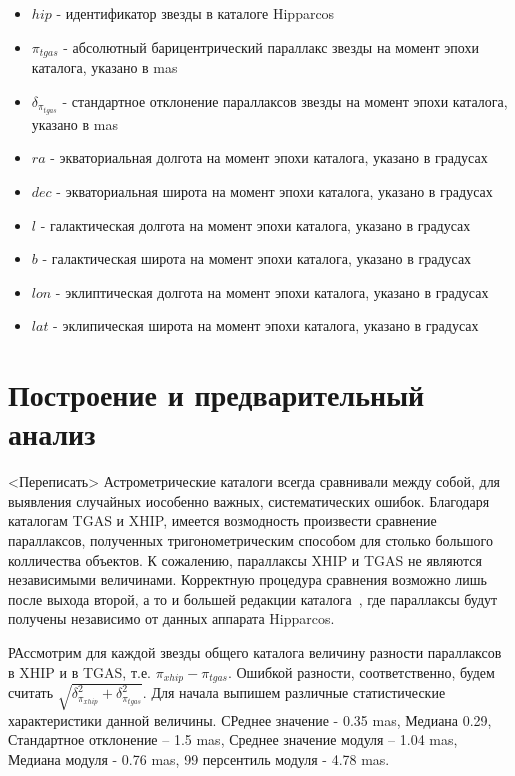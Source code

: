 \documentclass[14pt]{article} %
\begin{document}
\begin{itemize}

\item $hip$ - идентификатор звезды в каталоге Hipparcos

\item $\pi_{tgas}$ - абсолютный барицентрический параллакс звезды на момент эпохи каталога, указано в mas

\item $\delta_{\pi_{tgas}}$ - стандартное отклонение параллаксов звезды на момент эпохи каталога, указано в mas

\item $ra$ - экваториальная долгота на момент эпохи каталога, указано в градусах

\item $dec$ - экваториальная широта на момент эпохи каталога, указано в градусах

\item $l$ - галактическая долгота на момент эпохи каталога, указано в градусах

\item $b$ - галактическая широта на момент эпохи каталога, указано в градусах

\item $lon$ - эклиптическая долгота на момент эпохи каталога, указано в градусах

\item $lat$ - эклипическая широта на момент эпохи каталога, указано в градусах

\end{itemize}

\section{Построение и предварительный анализ}\label{errvid}
<Переписать>
Астрометрические каталоги всегда сравнивали между собой, для выявления случайных иособенно важных, систематических ошибок. Благодаря каталогам TGAS и XHIP, имеется возмодность произвести сравнение параллаксов, полученных тригонометрическим способом для столько большого колличества объектов. К сожалению, параллаксы XHIP и TGAS  не являются независимыми величинами. Корректную процедура сравнения возможно лишь после выхода второй, а то и большей редакции каталога~\cite{wiki:gaia}, где параллаксы будут получены независимо от данных аппарата Hipparcos.

РАссмотрим для каждой звезды общего каталога величину разности параллаксов в XHIP и в TGAS, т.е. $\pi_{xhip} - \pi_{tgas}$. Ошибкой разности, соответственно, будем считать $\sqrt{\delta^2_{\pi_{xhip}} + \delta^2_{\pi_{tgas}}}$. Для начала выпишем различные статистические характеристики данной величины. СРеднее значение - 0.35 mas, Медиана 0.29, Стандартное отклонение -- 1.5 mas, Среднее значение модуля -- 1.04 mas, Медиана модуля - 0.76 mas, 99 персентиль модуля - 4.78 mas. 
\end{document}
